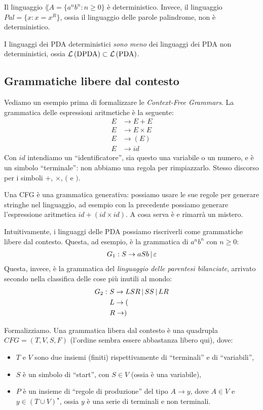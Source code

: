 Il linguaggio $\lang{A} = \{ a^n b^n : n \ge 0 \}$ \`e deterministico.
Invece, il linguaggio $Pal = \{ x : x = x^R \}$, ossia il linguaggio delle parole palindrome, non \`e deterministico.

I linguaggi dei PDA deterministici \emph{sono meno} dei linguaggi dei PDA non deterministici, ossia $\mathcal{L}\left( {\text{DPDA}} \right) \subset \mathcal{L}\left( {\text{PDA}} \right)$.

\subsection{Grammatiche libere dal contesto}

Vediamo un esempio prima di formalizzare le \emph{Context-Free Grammars}.
La grammatica delle espressioni aritmetiche \`e la seguente:
\begin{align*}
	E &\to E + E \\
	E &\to E \times E \\
	E &\to ( E ) \\
	E &\to id
\end{align*}
Con $id$ intendiamo un ``identificatore'', sia questo una variabile o un numero, e \`e un simbolo ``terminale'': non abbiamo una regola per rimpiazzarlo.
Stesso discorso per i simboli $+$, $\times$, $($ e $)$.

Una CFG \`e una grammatica generativa: possiamo usare le sue regole per generare stringhe nel linguaggio, ad esempio con la precedente possiamo generare l'espressione aritmetica $id + ( id \times id )$.
A cosa serva \`e e rimarr\`a un mistero.

Intuitivamente, i linguaggi delle PDA possiamo riscriverli come grammatiche libere dal contesto. Questa, ad esempio, \`e la grammatica di $a^n b^n$ con $n \ge 0$:
\begin{align*}
	G_1 : S \to aSb \, | \, \varepsilon
\end{align*}
Questa, invece, \`e la grammatica del \emph{linguaggio delle parentesi bilanciate}, arrivato secondo nella classifica delle cose pi\`u inutili al mondo:
\begin{align*}
	G_2 : \ & S \to LSR \, | \, SS \, | \, LR \\
	& L \to ( \\
	& R \to )
\end{align*}

Formalizziamo.
Una grammatica libera dal contesto \`e una quadrupla $CFG = (T, V, S, F)$ (l'ordine sembra essere abbastanza libero qui), dove:
\begin{itemize}
	\item $T$ e $V$ sono due insiemi (finiti) rispettivamente di ``terminali'' e di ``variabili'',
	\item $S$ \`e un simbolo di ``start'', con $S \in V$ (ossia \`e una variabile),
	\item $P$ \`e un insieme di ``regole di produzione'' del tipo $A \to y$, dove $A \in V$ e $y \in {(T \cup V)}^{\star}$, ossia $y$ \`e una serie di terminali e non terminali.
\end{itemize}

